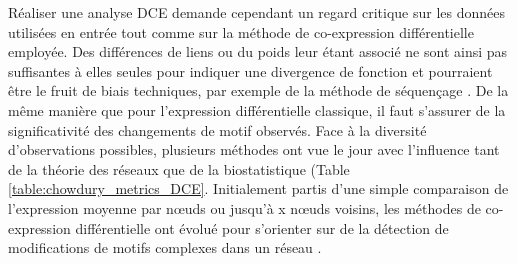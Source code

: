 Réaliser une analyse DCE demande cependant un regard critique sur les données utilisées en entrée tout comme sur la méthode de co-expression différentielle employée. Des différences de liens ou du poids leur étant associé ne sont ainsi pas suffisantes à elles seules pour indiquer une divergence de fonction et pourraient être le fruit de biais techniques, par exemple de la méthode de séquençage \cite{Southworth2009}. De la même manière que pour l'expression différentielle classique, il faut s'assurer de la significativité des changements de motif observés. Face à la diversité d'observations possibles, plusieurs méthodes ont vue le jour avec l'influence tant de la théorie des réseaux que de la biostatistique (Table \ref{table:chowdury_metrics_DCE}. Initialement partis d'une simple comparaison de l'expression moyenne par nœuds ou jusqu'à x nœuds voisins, les méthodes de co-expression différentielle ont évolué pour s'orienter sur de la détection de modifications de motifs complexes dans un réseau \cite{delaFuente2010Jul}. 

